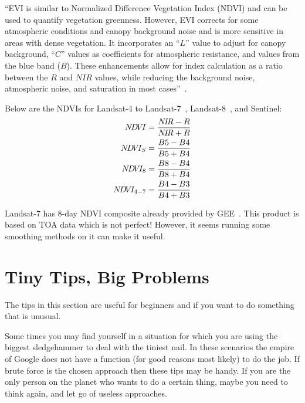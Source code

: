 ``EVI is similar to Normalized Difference 
Vegetation Index (NDVI) and can be used 
to quantify vegetation greenness. However, 
EVI corrects for some atmospheric conditions 
and canopy background noise and is more 
sensitive in areas with dense vegetation. 
It incorporates an ``$L$'' value to adjust for 
canopy background, ``$C$'' values as coefficients 
for atmospheric resistance, and values from 
the blue band ($B$).  These enhancements allow 
for index calculation as a ratio between 
the $R$ and $NIR$ values, while reducing the 
background noise, atmospheric noise, and 
saturation in most cases''~\citep{Landsat8EVI}.

Below are the NDVIs for 
Landsat-4 to Landsat-7~\citep{Landsat4NDVI},
Landsat-8~\citep{Landsat4NDVI}, and Sentinel:
\begin{gather}
\label{eq:NDVILandsat8}
\begin{aligned}
\NDVI &= \frac{\NIR - R}{\NIR + R}\\
\NDVI_S &= \frac{B5 - B4}{B5 + B4}\\
\NDVI_8 &= \frac{B8 - B4}{B8 + B4} \\
\NDVI_{4-7} &= \frac{B4 - B3}{B4 + B3} \\
\end{aligned}
\end{gather}

Landsat-7 has 8-day NDVI composite already provided 
by GEE~\citep{Landsat7NDVIComposite}. This product
is based on TOA data which is not perfect! However,
it seems running some smoothing methods on it can
make it useful.


\section{Tiny Tips, Big Problems}
\label{sec:Tiny-Tips-Big-Problems}
The tips in this section are useful for beginners and
if you want to do something that is unusual.

Some times you may find yourself in a situation
for which you are using the biggest sledgehammer to deal
with the tiniest nail. In these scenarios the empire of Google
does not have a function (for good reasons most likely) to do the job. 
If brute force is the chosen approach then these tips may be handy. 
If you are the only person on the planet who wants
to do a certain thing, maybe you need to think again,
and let go of useless approaches.

